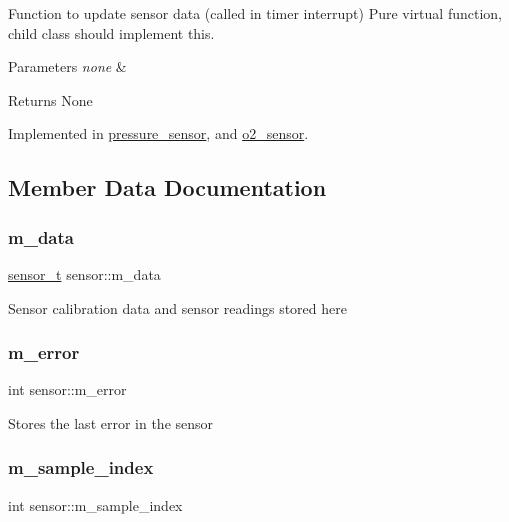 Function to update sensor data (called in timer interrupt) Pure virtual function, child class should implement this. 


\begin{DoxyParams}{Parameters}
{\em none} & \\
\hline
\end{DoxyParams}
\begin{DoxyReturn}{Returns}
None 
\end{DoxyReturn}


Implemented in \hyperlink{group___ventilator_module_gac8d67444e99afbc866b1d759cbfde3c5}{pressure\+\_\+sensor}, and \hyperlink{group___ventilator_module_ga460fc40d059c217fa41e4539cdb3c11d}{o2\+\_\+sensor}.



\subsection{Member Data Documentation}
\mbox{\label{classsensor_ac3e288dfa5563c9ea1acfb2316815618}} 
\subsubsection{\texorpdfstring{m\+\_\+data}{m\_data}}
{\footnotesize\ttfamily \hyperlink{structsensor__t}{sensor\+\_\+t} sensor\+::m\+\_\+data}

Sensor calibration data and sensor readings stored here \mbox{\label{classsensor_ae5e47730d9287ad3c933472361478adc}} 
\subsubsection{\texorpdfstring{m\+\_\+error}{m\_error}}
{\footnotesize\ttfamily int sensor\+::m\+\_\+error}

Stores the last error in the sensor \mbox{\label{classsensor_a4216ce667ad8873d1a45f2a1505209da}} 
\subsubsection{\texorpdfstring{m\+\_\+sample\+\_\+index}{m\_sample\_index}}
{\footnotesize\ttfamily int sensor\+::m\+\_\+sample\+\_\+index}

